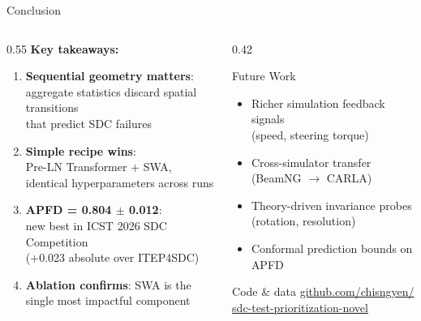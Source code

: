 \documentclass[aspectratio=169,10pt]{beamer}
\begin{document}
\begin{frame}{Conclusion}
  \begin{columns}[T]
    \begin{column}{0.55\linewidth}
      \textbf{Key takeaways:}
      \begin{enumerate}
        \item \textbf{Sequential geometry matters}:\\
              aggregate statistics discard spatial transitions\\
              that predict SDC failures
        \item \textbf{Simple recipe wins}:\\
              Pre-LN Transformer + SWA,\\
              identical hyperparameters across runs
        \item \textbf{APFD = 0.804 $\pm$ 0.012}:\\
              new best in ICST 2026 SDC Competition\\
              (+0.023 absolute over ITEP4SDC)
        \item \textbf{Ablation confirms}: SWA is the\\
              single most impactful component
      \end{enumerate}
    \end{column}
    \begin{column}{0.42\linewidth}
      \begin{block}{Future Work}
        \begin{itemize}
          \item Richer simulation feedback signals\\
                (speed, steering torque)
          \item Cross-simulator transfer\\
                (BeamNG $\to$ CARLA)
          \item Theory-driven invariance probes\\
                (rotation, resolution)
          \item Conformal prediction bounds on APFD
        \end{itemize}
      \end{block}
      \vspace{6pt}
      \begin{alertblock}{Code \& data}
        \small\url{github.com/chisngyen/}\\
        \url{sdc-test-prioritization-novel}
      \end{alertblock}
    \end{column}
  \end{columns}
\end{frame}
\end{document}

